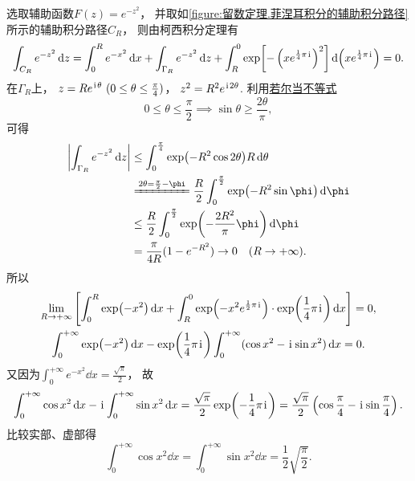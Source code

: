\begin{example}
\begin{solution}
选取辅助函数\(F(z) = e^{-z^2}\)，
并取如\cref{figure:留数定理.菲涅耳积分的辅助积分路径} 所示的辅助积分路径\(C_R\)，
则由柯西积分定理有\begin{equation*}
	\int_{C_R} e^{-z^2} \dd{z}
	= \int_0^R e^{-x^2} \dd{x}
	+ \int_{\Gamma_R} e^{-z^2} \dd{z}
	+ \int_R^0 \exp[-\left(x e^{\frac{1}{4}\pi\kern1pt\mathrm{i}\kern1pt}\right)^2] \dd(x e^{\frac{1}{4}\pi\kern1pt\mathrm{i}\kern1pt})
	= 0.
\end{equation*}
在\(\Gamma_R\)上，
\(z = R e^{\iu\theta}\ (0\leq\theta\leq\frac{\pi}{4})\)，
\(z^2 = R^2 e^{\kern1pt\mathrm{i}\kern1pt2\theta}\).
利用\hyperref[equation:微分中值定理.若尔当不等式]{若尔当不等式}\begin{equation*}
	0\leq\theta\leq\frac{\pi}{2}
	\implies
	\sin\theta\geq\frac{2\theta}{\pi},
\end{equation*}
可得\begin{align*}
	\abs{\int_{\Gamma_R} e^{-z^2} \dd{z}}
	&\leq
	\int_0^{\frac{\pi}{4}} \exp(-R^2 \cos2\theta) R\dd{\theta} \\
	&\xlongequal{2\theta=\frac{\pi}{2}-\phi}
	\frac{R}{2} \int_0^{\frac{\pi}{2}} \exp(-R^2 \sin\phi) \dd{\phi} \\
	&\leq
	\frac{R}{2} \int_0^{\frac{\pi}{2}} \exp(-\frac{2R^2}{\pi}\phi) \dd{\phi} \\
	&= \frac{\pi}{4R} (1-e^{-R^2})
	\to0\quad(R\to+\infty).
\end{align*}
所以\begin{gather*}
	\lim_{R\to+\infty} \left[
		\int_0^R \exp(-x^2) \dd{x}
		+ \int_R^0 \exp(-x^2 e^{\frac{1}{2}\pi\kern1pt\mathrm{i}\kern1pt})
		\cdot \exp(\frac{1}{4}\pi\kern1pt\mathrm{i}\kern1pt) \dd{x}
	\right] = 0, \\
	\int_0^{+\infty} \exp(-x^2) \dd{x}
	- \exp(\frac{1}{4}\pi\kern1pt\mathrm{i}\kern1pt)
	\int_0^{+\infty} (\cos x^2 - \kern1pt\mathrm{i}\kern1pt \sin x^2) \dd{x} = 0.
\end{gather*}
又因为\(\int_0^{+\infty} e^{-x^2} \dd{x} = \frac{\sqrt{\pi}}{2}\)，
故\begin{equation*}
	\int_0^{+\infty} \cos x^2 \dd{x}
	- \kern1pt\mathrm{i}\kern1pt \int_0^{+\infty} \sin x^2 \dd{x}
	= \frac{\sqrt{\pi}}{2} \exp(-\frac{1}{4}\pi\kern1pt\mathrm{i}\kern1pt)
	= \frac{\sqrt{\pi}}{2} \left(\cos\frac{\pi}{4} - \kern1pt\mathrm{i}\kern1pt \sin\frac{\pi}{4}\right).
\end{equation*}
比较实部、虚部得\begin{equation}\label{equation:留数定理.菲涅耳积分}
	\int_0^{+\infty} \cos x^2 \dd{x}
	= \int_0^{+\infty} \sin x^2 \dd{x}
	= \frac{1}{2} \sqrt{\frac{\pi}{2}}.
\end{equation}
\end{solution}
\end{example}

